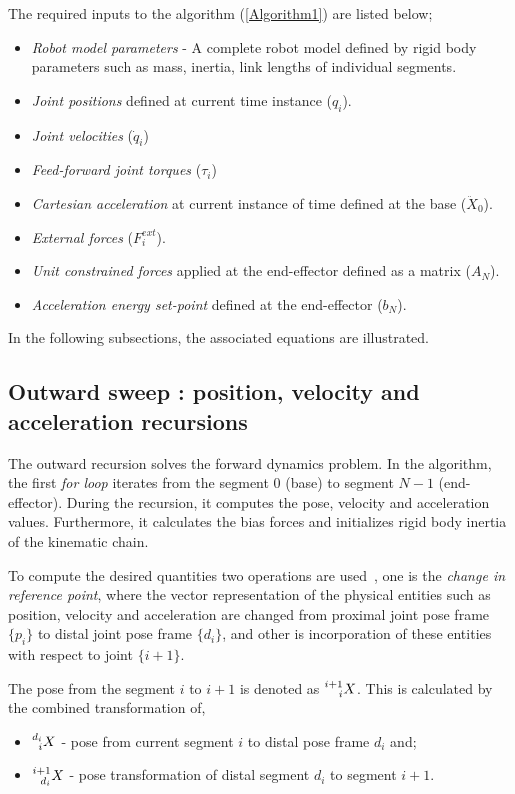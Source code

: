 The required inputs to the algorithm (\ref{Algorithm1}) are listed below;
\begin{itemize}
	\item \textit{Robot model parameters} - A complete robot model defined by rigid body parameters such as mass, inertia, link lengths of individual segments.
	\item \textit{Joint positions} defined at current time instance ($q_i$).
	\item \textit{Joint velocities} ($\dot{q}_i$)
	\item \textit{Feed-forward joint torques} ($\tau_i$)
	\item \textit{Cartesian acceleration} at current instance of time defined at the base ($\ddot{X}_0$).
	\item \textit{External forces} ($F^{ext}_i$).
	\item \textit{Unit constrained forces} applied at the end-effector defined as a matrix ($A_N$).
	\item \textit{Acceleration energy set-point} defined at the end-effector ($b_N$).
\end{itemize}

In the following subsections, the associated equations are illustrated.

\subsection{Outward sweep : position, velocity and acceleration recursions}
The outward recursion solves the forward dynamics problem. In the algorithm, the first \textit{for loop} iterates from the segment $0$ (base) to segment $N-1$ (end-effector). During the recursion, it computes the pose, velocity and acceleration values. Furthermore, it calculates the bias forces and initializes rigid body inertia of the kinematic chain. 

To compute the desired quantities two operations are used~\cite{shakhimardanov2015composable}, one is the \textit{change in reference point}, where the vector representation of the physical entities such as position, velocity and acceleration are changed from proximal joint pose frame $\{p_i\}$ to distal joint pose frame $\{d_i\}$, and other is incorporation of these entities with respect to joint $\{i+1\}$.

The pose from the segment $i$ to $i+1$ is denoted as $\prescript{i+1}{i}{X}$. This is calculated by the combined transformation of,\begin{itemize}
	\item $\prescript{d_i}{i}{X}$ - pose from current segment $i$ to distal pose frame $d_i$ and;
	\item $\prescript{i+1}{d_i}{X}$ - pose transformation of distal segment $d_i$ to segment $i+1$. 
\end{itemize} 

